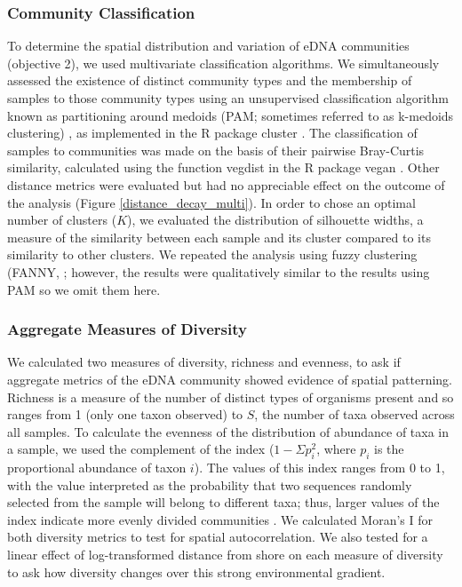 \documentclass[11pt,letterpaper]{article} %
\begin{document}
\subsubsection*{Community Classification}
To determine the spatial distribution and variation of eDNA communities (objective 2), we used multivariate classification algorithms. We simultaneously assessed the existence of distinct community types and the membership of samples to those community types using an unsupervised classification algorithm known as partitioning around medoids (PAM; sometimes referred to as k-medoids clustering) \citep{Kaufman1990}, as implemented in the R package cluster \citep{cluster}. The classification of samples to communities was made on the basis of their pairwise Bray-Curtis similarity, calculated using the function vegdist in the R package vegan \citep{vegan}. Other distance metrics were evaluated but had no appreciable effect on the outcome of the analysis (Figure \ref{distance_decay_multi}). In order to chose an optimal number of clusters ($K$), we evaluated the distribution of silhouette widths, a measure of the similarity between each sample and its cluster compared to its similarity to other clusters. We repeated the analysis using fuzzy clustering (FANNY, \citep{Kaufman1990}; however, the results were qualitatively similar to the results using PAM so we omit them here.


\subsubsection*{Aggregate Measures of Diversity}
We calculated two measures of diversity, richness and evenness, to ask if aggregate metrics of the eDNA community showed evidence of spatial patterning. Richness is a measure of the number of distinct types of organisms present and so ranges from 1 (only one taxon observed) to $S$, the number of taxa observed across all samples. To calculate the evenness of the distribution of abundance of taxa in a sample, we used the complement of the \citet{Simpson1949} index ($1 - \Sigma{p_{i}^2}$, where $p_i$ is the proportional abundance of taxon $i$). The values of this index ranges from 0 to 1, with the value interpreted as the probability that two sequences randomly selected from the sample will belong to different taxa; thus, larger values of the index indicate more evenly divided communities \citep{Magurran2004}. We calculated Moran's I for both diversity metrics to test for spatial autocorrelation. We also tested for a linear effect of log-transformed distance from shore on each measure of diversity to ask how diversity changes over this strong environmental gradient.
\end{document}
